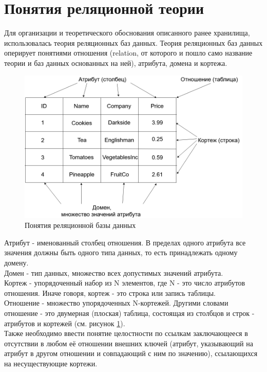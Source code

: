 \section{Понятия реляционной теории}
\indent Для организации и теоретического обоснования описанного ранее хранилища, использовалась теория реляционных баз данных.
\indent Теория реляционных баз данных оперирует понятиями отношения (relation, от которого и пошло само название теории и баз данных основанных на ней), атрибута, домена и кортежа.

\begin{figure}[ht]
	\centering
	\includegraphics[width=\linewidth]{pics/databaseExample.png}
	\caption{Понятия реляционной базы данных}
	\label{fig:dbExample}
\end{figure}

\indent Атрибут - именованный столбец отношения.
В пределах одного атрибута все значения должны быть одного типа данных, то есть принадлежать одному домену.\\
\indent Домен - тип данных, множество всех допустимых значений атрибута.\\
\indent Кортеж - упорядоченный набор из N элементов, где N - это число атрибутов отношения.
Иначе говоря, кортеж - это строка или запись таблицы.\\
\indent Отношение - множество упорядоченных N-кортежей.
Другими словами отношение - это двумерная (плоская) таблица, состоящая из столбцов и строк - атрибутов и кортежей (см. рисунок \ref{fig:dbExample}).\\
\indent Также необходимо ввести понятие целостности по ссылкам заключающееся в отсутствии в любом её отношении внешних ключей (атрибут, указывающий на атрибут в другом отношении и совпадающий с ним по значению), ссылающихся на несуществующие кортежи.

